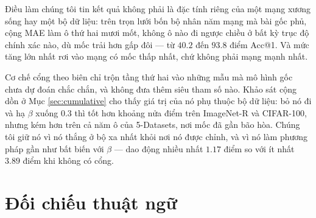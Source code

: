 \documentclass[11pt,a4paper]{article}
\begin{document}
Điều làm chúng tôi tin kết quả không phải là đặc tính riêng của một mạng
xương sống hay một bộ dữ liệu: trên trọn lưới bốn bộ nhân năm mạng mà bài
gốc phủ, cộng MAE làm ô thứ hai mươi mốt, không ô nào đi ngược chiều ở bất
kỳ trục độ chính xác nào, dù mốc trải hơn gấp đôi --- từ $40.2$ đến $93.8$
điểm Acc@1. Và mức tăng lớn nhất rơi vào mạng có mốc thấp nhất, chứ không
phải mạng mạnh nhất.

Cơ chế cổng theo biên chỉ trộn tầng thứ hai vào những mẫu mà mô hình gốc chưa
dự đoán chắc chắn, và không đưa thêm siêu tham số nào. Khảo sát cộng dồn ở Mục
\ref{sec:cumulative} cho thấy giá trị của nó phụ thuộc bộ dữ liệu: bỏ nó đi và
hạ $\beta$ xuống $0.3$ thì tốt hơn khoảng nửa điểm trên ImageNet-R và
CIFAR-100, nhưng kém hơn trên cả năm ô của 5-Datasets, nơi mốc đã gần bão hòa.
Chúng tôi giữ nó vì nó thắng ở bộ xa nhất khỏi nơi nó được chỉnh, và vì nó làm
phương pháp gần như bất biến với $\beta$ --- dao động nhiều nhất $1.17$ điểm so
với ít nhất $3.89$ điểm khi không có cổng.

\appendix

\section{Đối chiếu thuật ngữ}
\end{document}
